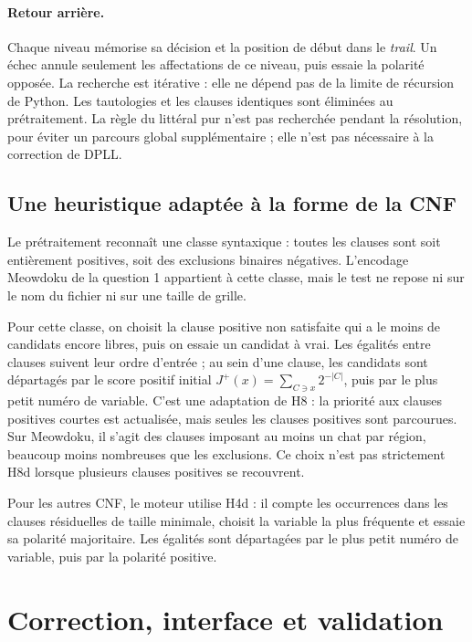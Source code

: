 \documentclass[10pt,a4paper]{article}
\begin{document}
\paragraph{Retour arrière.} Chaque niveau mémorise sa décision et la
position de début dans le \emph{trail}. Un échec annule seulement les
affectations de ce niveau, puis essaie la polarité opposée. La recherche
est itérative : elle ne dépend pas de la limite de récursion de Python.
Les tautologies et les clauses identiques sont éliminées au prétraitement.
La règle du littéral pur n'est pas recherchée pendant la résolution, pour
éviter un parcours global supplémentaire ; elle n'est pas nécessaire à
la correction de DPLL.

\subsection{Une heuristique adaptée à la forme de la CNF}

Le prétraitement reconnaît une classe syntaxique : toutes les clauses sont
soit entièrement positives, soit des exclusions binaires négatives.
L'encodage Meowdoku de la question 1 appartient à cette classe, mais le
test ne repose ni sur le nom du fichier ni sur une taille de grille.

Pour cette classe, on choisit la clause positive non satisfaite qui a le
moins de candidats encore libres, puis on essaie un candidat à vrai.
Les égalités entre clauses suivent leur ordre d'entrée ; au sein d'une
clause, les candidats sont départagés par le score positif initial
$J^+(x)=\sum_{C\ni x}2^{-|C|}$, puis par le plus petit numéro de variable.
C'est une adaptation de H8 : la priorité aux clauses positives courtes est
actualisée, mais seules les clauses positives sont parcourues. Sur
Meowdoku, il s'agit des clauses imposant au moins un chat par région,
beaucoup moins nombreuses que les exclusions. Ce choix n'est pas
strictement H8d lorsque plusieurs clauses positives se recouvrent.

Pour les autres CNF, le moteur utilise H4d : il compte les occurrences dans
les clauses résiduelles de taille minimale, choisit la variable la plus
fréquente et essaie sa polarité majoritaire. Les égalités sont départagées
par le plus petit numéro de variable, puis par la polarité positive.

\clearpage
\section{Correction, interface et validation}
\end{document}
